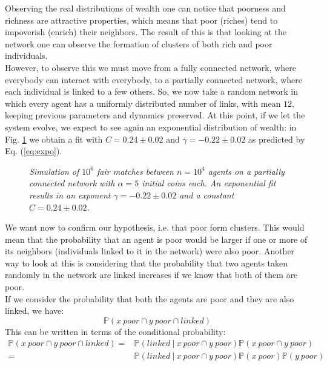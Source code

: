 Observing the real distributions of wealth one can notice that poorness and richness are attractive properties, which means that poor (riches) tend to impoverish (enrich) their neighbors.
The result of this is that looking at the network one can observe the formation of clusters of both rich and poor individuals. \\
However, to observe this we must move from a fully connected network, where everybody can interact with everybody, to a partially connected network, where each individual is linked to a few others.
So, we now take a random network in which every agent has a uniformly distributed number of links, with mean $12$, keeping previous parameters and dynamics preserved.
At this point, if we let the system evolve, we expect to see again an exponential distribution of wealth: in Fig. \ref{fig:fixedExpo} we obtain a fit with $C = 0.24 \pm 0.02$ and $\gamma = -0.22 \pm 0.02$ as predicted by Eq. (\ref{eq:expo}).
\begin{figure}[H]
    \centering
    \scalebox{.7}{}
    \caption{\emph{Simulation of $10^6$ fair matches between $n = 10^4$ agents on a partially connected network with $\alpha = 5$ initial coins each. 
                    An exponential fit results in an exponent $\gamma = -0.22 \pm 0.02$ and a constant $C = 0.24 \pm 0.02$.}}
    \label{fig:fixedExpo}
\end{figure}
We want now to confirm our hypothesis, i.e. that poor form clusters.
This would mean that the probability that an agent is poor would be larger if one or more of its neighbors (individuals linked to it in the network) were also poor. Another way to look at this is considering that the probability that two agents taken randomly in the network are linked increases if we know that both of them are poor. \\
If we consider the probability that both the agents are poor and they are also linked, we have:
\begin{equation*}
    \mathbb{P}(x \ poor \cap y \ poor \cap linked)
\end{equation*}
This can be written in terms of the conditional probability:
\begin{equation*}
    \begin{split}
        \mathbb{P}(x \ poor \cap y \ poor \cap linked) =& \mathbb{P}(linked \ \vert \ x \ poor \cap y \ poor) \mathbb{P}(x \ poor \cap y \ poor)\\
	                                                   =& \mathbb{P}(linked \ \vert \ x \ poor \cap y \ poor) \mathbb{P}(x \ poor)\mathbb{P}(y \ poor)
    \end{split}
\end{equation*}
